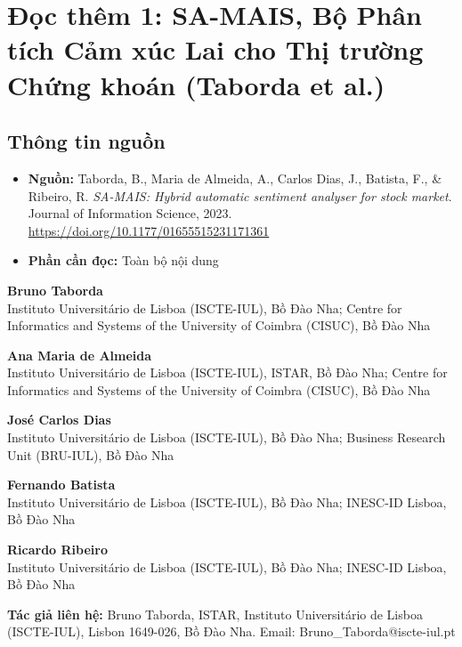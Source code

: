 \chapter{Đọc thêm 1: SA-MAIS, Bộ Phân tích Cảm xúc Lai cho Thị trường Chứng khoán (Taborda et al.)}
\label{ch:M4L3DT1}


\section{Thông tin nguồn}

\begin{itemize}
  \item \textbf{Nguồn:} Taborda, B., Maria de Almeida, A., Carlos Dias, J., Batista, F., \& Ribeiro, R. \emph{SA-MAIS: Hybrid automatic sentiment analyser for stock market}. Journal of Information Science, 2023. \url{https://doi.org/10.1177/01655515231171361}
  \item \textbf{Phần cần đọc:} Toàn bộ nội dung
\end{itemize}

\bigskip
\noindent\textbf{Bruno Taborda}\\
{\small Instituto Universitário de Lisboa (ISCTE-IUL), Bồ Đào Nha; Centre for Informatics and Systems of the University of Coimbra (CISUC), Bồ Đào Nha}

\noindent\textbf{Ana Maria de Almeida}\\
{\small Instituto Universitário de Lisboa (ISCTE-IUL), ISTAR, Bồ Đào Nha; Centre for Informatics and Systems of the University of Coimbra (CISUC), Bồ Đào Nha}

\noindent\textbf{José Carlos Dias}\\
{\small Instituto Universitário de Lisboa (ISCTE-IUL), Bồ Đào Nha; Business Research Unit (BRU-IUL), Bồ Đào Nha}

\noindent\textbf{Fernando Batista}\\
{\small Instituto Universitário de Lisboa (ISCTE-IUL), Bồ Đào Nha; INESC-ID Lisboa, Bồ Đào Nha}

\noindent\textbf{Ricardo Ribeiro}\\
{\small Instituto Universitário de Lisboa (ISCTE-IUL), Bồ Đào Nha; INESC-ID Lisboa, Bồ Đào Nha}

\bigskip
{\small \textbf{Tác giả liên hệ:} Bruno Taborda, ISTAR, Instituto Universitário de Lisboa (ISCTE-IUL), Lisbon 1649-026, Bồ Đào Nha. Email: Bruno\_Taborda@iscte-iul.pt}


